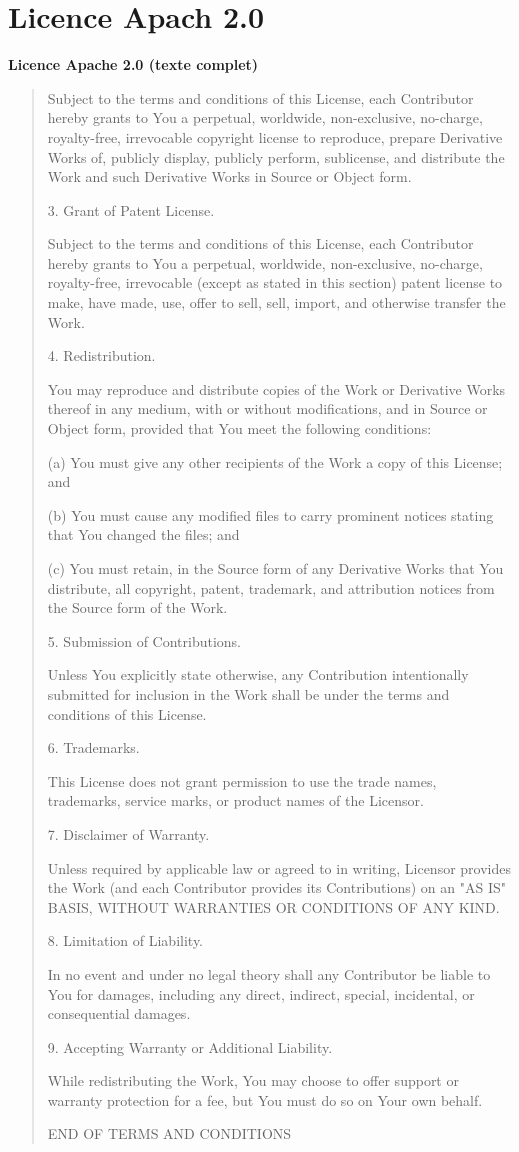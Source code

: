 \documentclass[12pt,a4paper]{article}
\theoremstyle{definition}
\theoremstyle{remark}
\begin{document}
\section{Licence Apach 2.0}
\bigskip
\noindent\textbf{Licence Apache 2.0 (texte complet)}

\begin{quote}
Subject to the terms and conditions of this License, each Contributor
hereby grants to You a perpetual, worldwide, non-exclusive, no-charge,
royalty-free, irrevocable copyright license to reproduce, prepare
Derivative Works of, publicly display, publicly perform, sublicense,
and distribute the Work and such Derivative Works in Source or Object
form.

3. Grant of Patent License.

Subject to the terms and conditions of this License, each Contributor
hereby grants to You a perpetual, worldwide, non-exclusive, no-charge,
royalty-free, irrevocable (except as stated in this section) patent
license to make, have made, use, offer to sell, sell, import, and
otherwise transfer the Work.

4. Redistribution.

You may reproduce and distribute copies of the Work or Derivative
Works thereof in any medium, with or without modifications, and in
Source or Object form, provided that You meet the following conditions:

(a) You must give any other recipients of the Work a copy of this
    License; and

(b) You must cause any modified files to carry prominent notices
    stating that You changed the files; and

(c) You must retain, in the Source form of any Derivative Works that
    You distribute, all copyright, patent, trademark, and attribution
    notices from the Source form of the Work.

5. Submission of Contributions.

Unless You explicitly state otherwise, any Contribution intentionally
submitted for inclusion in the Work shall be under the terms and
conditions of this License.

6. Trademarks.

This License does not grant permission to use the trade names,
trademarks, service marks, or product names of the Licensor.

7. Disclaimer of Warranty.

Unless required by applicable law or agreed to in writing, Licensor
provides the Work (and each Contributor provides its Contributions)
on an "AS IS" BASIS, WITHOUT WARRANTIES OR CONDITIONS OF ANY KIND.

8. Limitation of Liability.

In no event and under no legal theory shall any Contributor be liable
to You for damages, including any direct, indirect, special,
incidental, or consequential damages.

9. Accepting Warranty or Additional Liability.

While redistributing the Work, You may choose to offer support or
warranty protection for a fee, but You must do so on Your own behalf.

END OF TERMS AND CONDITIONS
\end{quote}
\end{document}
